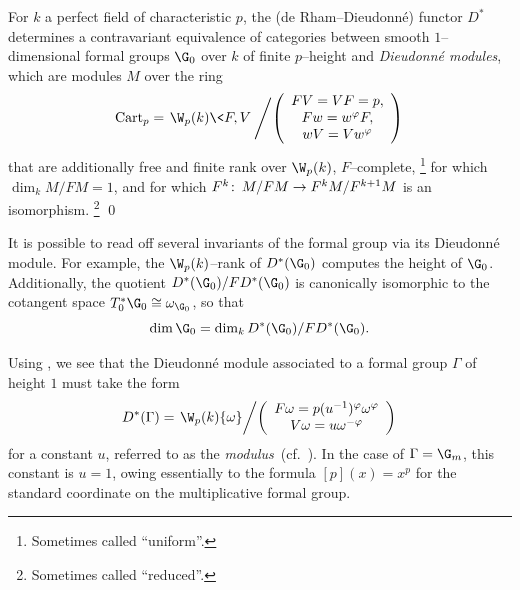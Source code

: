 \begin{theorem}\label{MainContraDieudonneThm}
For \(k\) a perfect field of characteristic \(p\), the (de Rham--Dieudonn\'e) functor \(D^*\) determines a contravariant equivalence of categories between smooth \(1\)--dimensional formal groups \(\G_0\) over \(k\) of finite \(p\)--height and \textit{Dieudonn\'e modules}, which are modules \(M\) over the ring \[\Cart_p = \left. \W_p(k)\<F,V\> \middle/ \left( \begin{array}{c} FV = VF = p, \\ Fw = w^\phi F, \\ wV = Vw^\phi \end{array} \right) \right.\] that are additionally free and finite rank over \(\W_p(k)\), \(F\)--complete,%
\footnote{%
Sometimes called ``uniform''.
}
for which \(\dim_k M / FM = 1\), and for which \(F^k\colon\thinspace M / FM \to F^kM / F^{k+1}M\) is an isomorphism.%
\footnote{%
Sometimes called ``reduced''.
}
\qed
\end{theorem}

\begin{remark}\label{InvariantsFromDModule}
It is possible to read off several invariants of the formal group via its Dieudonn\'e module.
For example, the \(\W_p(k)\)--rank of \(D^*(\G_0)\) computes the height of \(\G_0\).
Additionally, the quotient \(D^*(\G_0) / FD^*(\G_0)\) is canonically isomorphic to the cotangent space \(T_0^* \G_0 \cong \omega_{\G_0}\), so that \[\dim \G_0 = \dim_k D^*(\G_0) / FD^*(\G_0).\]
\end{remark}

\begin{example}
Using , we see that the Dieudonn\'e module associated to a formal group \(\Gamma\) of height \(1\) must take the form \[D^*(\Gamma) = \left. \W_p(k)\{\omega\} \middle/ \left( \begin{array}{c} F\omega = p (u^{-1})^\phi \omega^\phi \\ V\omega = u \omega^{-\phi} \end{array} \right)\right.\] for a constant \(u\), referred to as the \textit{modulus}~(cf.\ \cite[Theorem 4.2.2]{MoravaFormsOfKthy}).
In the case of \(\Gamma = \G_m\), this constant is \(u = 1\), owing essentially to the formula \([p](x) = x^p\) for the standard coordinate on the multiplicative formal group.
\end{example}

